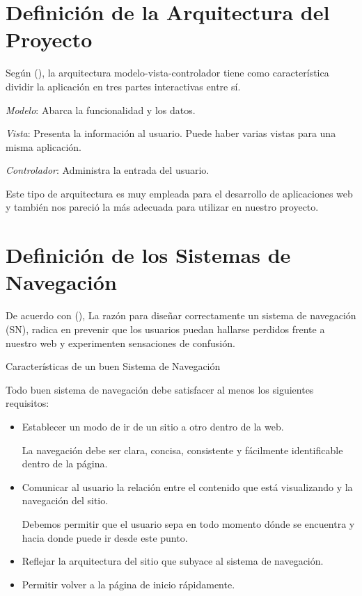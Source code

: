  

\section{Definición de la Arquitectura del Proyecto}

Según (\cite{huet-2023}), la arquitectura modelo-vista-controlador tiene como característica dividir la aplicación en tres partes interactivas entre sí.

\textit{Modelo}: Abarca la funcionalidad y los datos.

\textit{Vista}: Presenta la información al usuario. Puede haber varias vistas para una misma aplicación.

\textit{Controlador}: Administra la entrada del usuario.

Este tipo de arquitectura es muy empleada para el desarrollo de aplicaciones web y también nos pareció la más adecuada para utilizar en nuestro proyecto.



\section{Definición de los Sistemas de Navegación}

De acuerdo con (\cite{joven-2011}), La razón para diseñar correctamente un sistema de navegación (SN), radica en prevenir que los usuarios puedan hallarse perdidos frente a nuestro web y experimenten sensaciones de confusión.

Características de un buen Sistema de Navegación

Todo buen sistema de navegación debe satisfacer al menos los siguientes requisitos:

\begin{itemize}
	\item Establecer un modo de ir de un sitio a otro dentro de la web.
	
	La navegación debe ser clara, concisa, consistente y fácilmente identificable dentro de la página. 
	
	\item Comunicar al usuario la relación entre el contenido que está visualizando y la navegación del sitio.
	
	Debemos permitir que el usuario sepa en todo momento dónde se encuentra y hacia donde puede ir desde este punto.
	
	\item Reflejar la arquitectura del sitio que subyace al sistema de navegación.
	
	\item Permitir volver a la página de inicio rápidamente.
\end{itemize}

